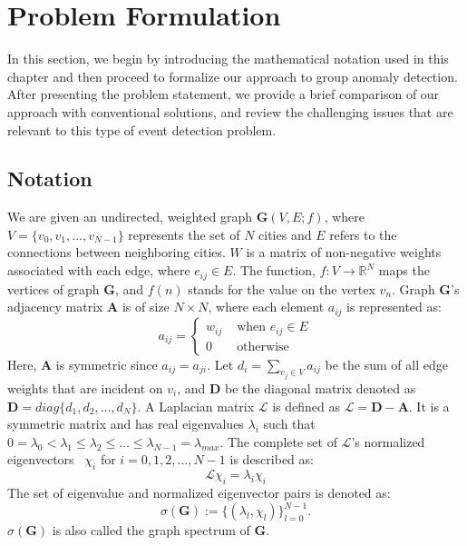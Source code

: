 \section{Problem Formulation}
\label{sec:problem}
In this section, we begin by introducing the mathematical notation used in this chapter and then proceed to formalize our approach to group anomaly detection. After presenting the problem statement, we provide a brief comparison of our approach with conventional solutions, and review the challenging issues that are relevant to this type of event detection problem.
\subsection{Notation}
\label{sec:notations}
We are given an undirected, weighted graph $\mathbf{G}(V,E;f)$, where $V=\{v_0,v_1,...,v_{N-1}\}$ represents the set of $N$ cities and $E$ refers to the connections between neighboring cities. $W$ is a matrix of non-negative weights associated with each edge, where $e_{ij}\in E$. The function, $f: V \rightarrow {\mathbb{R}}^N$ maps the vertices of graph $\mathbf{G}$, and $f(n)$ stands for the value on the vertex $v_n$. Graph $\mathbf{G}$'s adjacency matrix $\mathbf{A}$ is of size $N\times N$, where each element $a_{ij}$ is represented as:
\begin{equation}
a_{ij} = \left\{ \begin{array}{rl}
 w_{ij} &\mbox{ when $e_{ij}\in {E}$} \\
  0 &\mbox{ otherwise}
       \end{array} \right.
\end{equation}
Here, $\mathbf{A}$ is symmetric since $a_{ij}=a_{ji}$.
Let $d_i=\sum\limits_{v_j \in V}a_{ij}$ be the sum of all edge weights that are incident on $v_i$, and $\mathbf{D}$ be the diagonal matrix denoted as $\mathbf{D}=diag\{d_1,d_2,\ldots,d_N\}$. A Laplacian matrix $\mathcal{L}$ is defined as $\mathcal{L}=\mathbf{D-A}$. It is a symmetric matrix and has real eigenvalues $\lambda_{i}$ such that $0 = \lambda_{0} < \lambda_{1} \leq \lambda_{2} \leq \ldots \leq \lambda_{N-1} = \lambda_{max}$. The complete set of $\mathcal{L}$'s normalized eigenvectors~\cite{bapat2010graphs} $\chi_{i}$ for $i=0,1,2,...,N-1$ is described as:
\begin{equation}
\label{eq:eigenvalues}
\mathcal{L}\chi_{i}=\lambda_{i}\chi_{i}
\end{equation}
The set of eigenvalue and normalized eigenvector pairs is denoted as:
\begin{equation}
\label{eq:spectrum}
\sigma({\mathbf{G}}):=\{(\lambda_l,\chi_l)\}_{l=0}^{N-1}.
\end{equation}$\sigma({\mathbf{G}})$ is also called the graph spectrum of $\mathbf{G}$.




